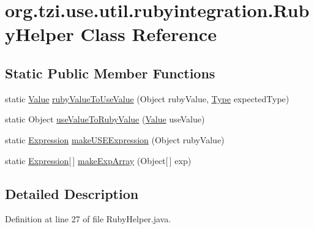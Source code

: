 \hypertarget{classorg_1_1tzi_1_1use_1_1util_1_1rubyintegration_1_1_ruby_helper}{\section{org.\-tzi.\-use.\-util.\-rubyintegration.\-Ruby\-Helper Class Reference}
\label{classorg_1_1tzi_1_1use_1_1util_1_1rubyintegration_1_1_ruby_helper}
}
\subsection*{Static Public Member Functions}
\begin{DoxyCompactItemize}
\item 
static \hyperlink{classorg_1_1tzi_1_1use_1_1uml_1_1ocl_1_1value_1_1_value}{Value} \hyperlink{classorg_1_1tzi_1_1use_1_1util_1_1rubyintegration_1_1_ruby_helper_ab608ee4e67d2b037418cba92c10542aa}{ruby\-Value\-To\-Use\-Value} (Object ruby\-Value, \hyperlink{interfaceorg_1_1tzi_1_1use_1_1uml_1_1ocl_1_1type_1_1_type}{Type} expected\-Type)
\item 
static Object \hyperlink{classorg_1_1tzi_1_1use_1_1util_1_1rubyintegration_1_1_ruby_helper_aa6b3c99ed2627b17a2b422bfee12b157}{use\-Value\-To\-Ruby\-Value} (\hyperlink{classorg_1_1tzi_1_1use_1_1uml_1_1ocl_1_1value_1_1_value}{Value} use\-Value)
\item 
static \hyperlink{classorg_1_1tzi_1_1use_1_1uml_1_1ocl_1_1expr_1_1_expression}{Expression} \hyperlink{classorg_1_1tzi_1_1use_1_1util_1_1rubyintegration_1_1_ruby_helper_a94aa42d3238a102e2064648d0a8ca187}{make\-U\-S\-E\-Expression} (Object ruby\-Value)
\item 
static \hyperlink{classorg_1_1tzi_1_1use_1_1uml_1_1ocl_1_1expr_1_1_expression}{Expression}\mbox{[}$\,$\mbox{]} \hyperlink{classorg_1_1tzi_1_1use_1_1util_1_1rubyintegration_1_1_ruby_helper_a21735b108e1e71952f62b8bdd91c0308}{make\-Exp\-Array} (Object\mbox{[}$\,$\mbox{]} exp)
\end{DoxyCompactItemize}


\subsection{Detailed Description}


Definition at line 27 of file Ruby\-Helper.\-java.



